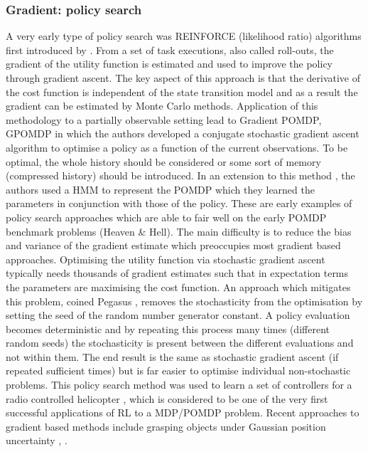 \subsubsection{Gradient: policy search}

A very early type of policy search was REINFORCE (likelihood ratio) algorithms
first introduced by \cite{reinforce_1992}. From a set of task executions, also called roll-outs, the gradient
of the utility function is estimated and used to improve the policy through gradient ascent. 
The key aspect of this approach is that the derivative of the cost function is independent of the state transition model 
and as a result the gradient can be estimated by Monte Carlo methods. Application of this methodology 
to a partially observable setting lead to Gradient POMDP, GPOMDP \cite{gpomdp_2000} in which the authors developed 
a conjugate stochastic gradient ascent algorithm to optimise a policy as a function of the current observations.
To be optimal, the whole history should be considered or some sort of memory (compressed history) should be introduced. 
In an extension to this method \cite{sis_pomdp_2002}, the authors used a HMM to represent the POMDP which they 
learned the parameters in conjunction with those of the policy. These are early examples of policy search approaches 
which are able to fair well on the early POMDP benchmark problems (Heaven \& Hell). 
The main difficulty is to reduce the bias and variance of the gradient estimate which preoccupies most gradient based approaches. 
Optimising the utility function via stochastic gradient ascent typically needs thousands of gradient estimates such that in expectation terms the parameters are maximising the cost function. 
An approach which mitigates this problem, coined Pegasus \cite{Pegasus_2000}, removes the stochasticity from the optimisation 
by setting the seed of the random number generator constant. A policy evaluation becomes deterministic and by repeating this process many times (different random seeds) the stochasticity
is present between the different evaluations and not within them. The end result is the same as stochastic gradient ascent 
(if repeated sufficient times) but is far easier to optimise individual non-stochastic problems. This policy search 
method was used to learn a set of controllers for a radio controlled helicopter \cite{heli_2004}, which is considered to 
be one of the very first successful applications of RL to a MDP/POMDP problem. Recent approaches to gradient based methods
include grasping objects under Gaussian position uncertainty \cite{dmp_iros_2011}, \cite{dmp_seq_2012}.

